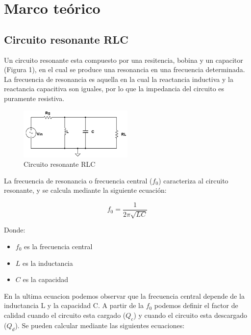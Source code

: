 \section{Marco teórico}

\subsection{Circuito resonante RLC}

Un circuito resonante esta compuesto por una resitencia, bobina y un capacitor (Figura 1), en el cual se produce una resonancia en una frecuencia determinada. La frecuencia de resonancia es aquella en 
la cual la reactancia inductiva y la reactancia capacitiva son iguales, por lo que la impedancia del circuito es puramente resistiva. 

\begin{figure}[h]
    \centering
    \includegraphics[width=0.5\textwidth]{Imagenes/circuito_resonante.png}
    \caption{Circuito resonante RLC}
    \label{fig:circuito_resonante}
\end{figure}

La frecuencia de resonancia o frecuencia central ($f_0$) caracteriza al circuito resonante, y se calcula mediante la siguiente ecuación:

\begin{equation}
    f_0 = \frac{1}{2\pi \sqrt{LC}}
\end{equation}

Donde: 
\begin{itemize}
    \item $f_0$ es la frecuencia central
    \item $L$ es la inductancia
    \item $C$ es la capacidad
\end{itemize}

En la ultima ecuacion podemos observar que la frecuencia central depende de la inductancia L  y la capacidad C. 
A partir de la $f_0$ podemos definir el factor de calidad cuando el circuito esta cargado ($Q_c$) y cuando el circuito esta descargado ($Q_d$). 
Se pueden calcular mediante las siguientes ecuaciones:

